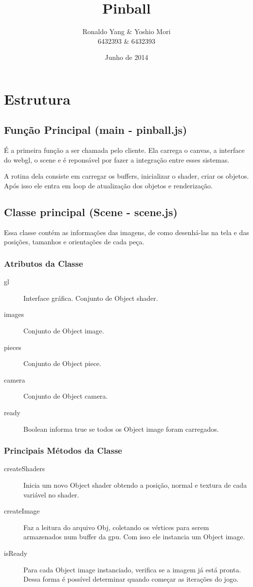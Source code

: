 \documentclass[a4paper,12pt]{article}
\title{Pinball}
\author{Ronaldo Yang \& Yoshio Mori
  \\
  \small 6432393 \& 6432393
}
\date{Junho de 2014} %
\begin{document}
\pagestyle{myheadings}
\maketitle
\newpage
\tableofcontents
\pagebreak

\section{Estrutura}
\subsection{Função Principal (main - pinball.js)}
É a primeira função a ser chamada pelo cliente. Ela carrega o canvas, a interface do webgl, o scene e é reponsável por fazer a integração entre esses sistemas.

A rotina dela consiste em carregar os buffers, inicializar o shader, criar os objetos. Após isso ele entra em loop de atualização dos objetos e renderização.

\subsection{Classe principal (Scene - scene.js)}
Essa classe contém as informações das imagens, de como desenhá-las na tela e das posições, tamanhos e orientações de cada peça.

\subsubsection{Atributos da Classe}
\begin{description}
\item[gl] Interface gráfica.
  \subitem[shaders] Conjunto de Object shader.
\item[images] Conjunto de Object image.
\item[pieces] Conjunto de Object piece.
\item[camera] Conjunto de Object camera.
\item[ready] Boolean informa true se todos os Object image foram carregados.
\end{description}
\subsubsection{Principais Métodos da Classe}
\begin{description}
\item[createShaders] Inicia um novo Object shader obtendo a posição, normal e textura de cada variável no shader.
\item[createImage] Faz a leitura do arquivo Obj, coletando os vértices para serem armazenados num buffer da gpu. Com isso ele instancia um Object image.
\item[isReady] Para cada Object image instanciado, verifica se a imagem já está pronta. Dessa forma é possível determinar quando começar as iterações do jogo.
\end{description}
\end{document}
